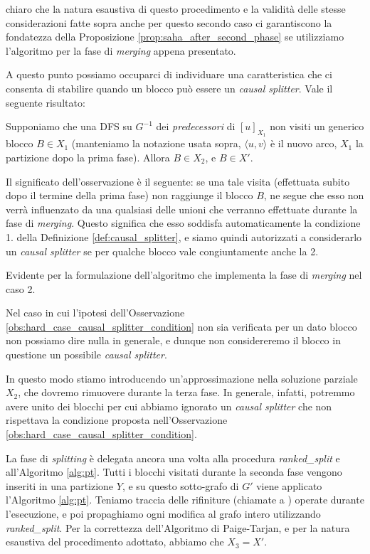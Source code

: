 \accente chiaro che la natura esaustiva di questo procedimento e la validità delle stesse considerazioni fatte sopra anche per questo secondo caso ci garantiscono la fondatezza della Proposizione \ref{prop:saha_after_second_phase} se utilizziamo l'algoritmo per la fase di \emph{merging} appena presentato.

A questo punto possiamo occuparci di individuare una caratteristica che ci consenta di stabilire quando un blocco può essere un \emph{causal splitter}. Vale il seguente risultato:

\begin{observation}
    \label{obs:hard_case_causal_splitter_condition}
    Supponiamo che una DFS su $G^{-1}$ dei \emph{predecessori} di $[u]_{X_1}$ non visiti un generico blocco $B \in X_1$ (manteniamo la notazione usata sopra, $\langle u,v \rangle$ è il nuovo arco, $X_1$ la partizione dopo la prima fase). Allora $B \in X_2$, e $B \in X'$.
\end{observation}

Il significato dell'osservazione è il seguente: se una tale visita (effettuata subito dopo il termine della prima fase) non raggiunge il blocco $B$, ne segue che esso non verrà influenzato da una qualsiasi delle unioni che verranno effettuate durante la fase di \emph{merging}. Questo significa che esso soddisfa automaticamente la condizione 1. della Definizione \ref{def:causal_splitter}, e siamo quindi autorizzati a considerarlo un \emph{causal splitter} se per qualche blocco vale congiuntamente anche la 2.

\begin{proof2}
    Evidente per la formulazione dell'algoritmo che implementa la fase di \emph{merging} nel caso 2.
\end{proof2}

Nel caso in cui l'ipotesi dell'Osservazione \ref{obs:hard_case_causal_splitter_condition} non sia verificata per un dato blocco non possiamo dire nulla in generale, e dunque non considereremo il blocco in questione un possibile \emph{causal splitter}.

In questo modo stiamo introducendo un'approssimazione nella soluzione parziale $X_2$, che dovremo rimuovere durante la terza fase. In generale, infatti, potremmo avere unito dei blocchi per cui abbiamo ignorato un \emph{causal splitter} che non rispettava la condizione proposta nell'Osservazione \ref{obs:hard_case_causal_splitter_condition}.

La fase di \emph{splitting} è delegata ancora una volta alla procedura \emph{ranked\_split} e all'Algoritmo \ref{alg:pt}. Tutti i blocchi visitati durante la seconda fase vengono inseriti in una partizione $Y$, e su questo sotto-grafo di $G'$ viene applicato l'Algoritmo \ref{alg:pt}. Teniamo traccia delle rifiniture (chiamate a \splitfunc) operate durante l'esecuzione, e poi propaghiamo ogni modifica al grafo intero utilizzando \emph{ranked\_split}. Per la correttezza dell'Algoritmo di Paige-Tarjan, e per la natura esaustiva del procedimento adottato, abbiamo che $X_3 = X'$.

